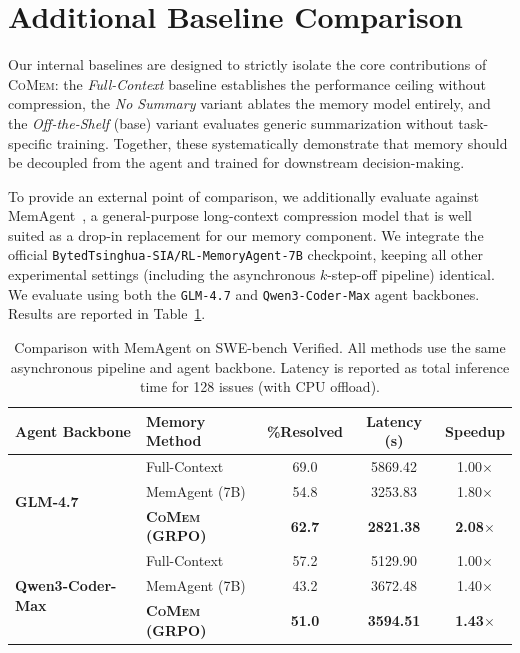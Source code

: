 \documentclass{article}
\theoremstyle{plain}
\theoremstyle{definition}
\theoremstyle{remark}
\newcommand{\model}{\textsc{CoMem}\xspace}
\begin{document}
\section{Additional Baseline Comparison}
\label{app:memagent}

Our internal baselines are designed to strictly isolate the core contributions of {\model}: the \emph{Full-Context} baseline establishes the performance ceiling without compression, the \emph{No Summary} variant ablates the memory model entirely, and the \emph{Off-the-Shelf} (base) variant evaluates generic summarization without task-specific training. Together, these systematically demonstrate that memory should be decoupled from the agent and trained for downstream decision-making.

To provide an external point of comparison, we additionally evaluate against MemAgent~\citep{yu2025memagent}, a general-purpose long-context compression model that is well suited as a drop-in replacement for our memory component. We integrate the official \texttt{BytedTsinghua-SIA/RL-MemoryAgent-7B} checkpoint, keeping all other experimental settings (including the asynchronous $k$-step-off pipeline) identical. We evaluate using both the \texttt{GLM-4.7} and \texttt{Qwen3-Coder-Max} agent backbones. Results are reported in Table~\ref{tab:memagent}.

\begin{table}[h]
\centering
\setlength{\tabcolsep}{6pt}
\renewcommand{\arraystretch}{1.3}
\caption{Comparison with MemAgent on SWE-bench Verified. All methods use the same asynchronous pipeline and agent backbone. Latency is reported as total inference time for 128 issues (with CPU offload).}
\label{tab:memagent}
\begin{tabular}{l l c c c}
\toprule
Agent Backbone & Memory Method & \%Resolved & Latency (s) & Speedup \\
\midrule
\multirow{3}{*}{\textbf{GLM-4.7}}
 & Full-Context & 69.0 & 5869.42 & 1.00$\times$ \\
 & MemAgent (7B) & 54.8 & 3253.83 & 1.80$\times$ \\
 & \textbf{{\model} (GRPO)} & \textbf{62.7} & \textbf{2821.38} & \textbf{2.08}$\times$ \\
\midrule
\multirow{3}{*}{\textbf{Qwen3-Coder-Max}}
 & Full-Context & 57.2 & 5129.90 & 1.00$\times$ \\
 & MemAgent (7B) & 43.2 & 3672.48 & 1.40$\times$ \\
 & \textbf{{\model} (GRPO)} & \textbf{51.0} & \textbf{3594.51} & \textbf{1.43}$\times$ \\
\bottomrule
\end{tabular}
\end{table}
\end{document}
